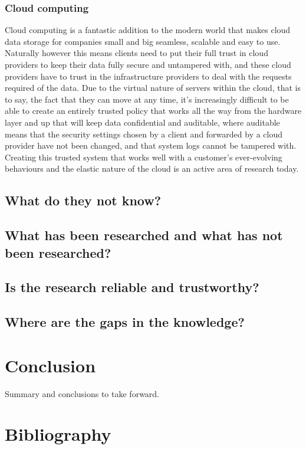 \documentclass[a4paper, 11pt]{article}
\begin{document}
\subsubsection{Cloud computing}
Cloud computing is a fantastic addition to the modern world that makes cloud data storage for companies small and big seamless, scalable and easy to use. \cite{ref:jang2014survey} Naturally however this means clients need to put their full trust in cloud providers to keep their data fully secure and untampered \cite{ref:zhang2010cloud} with, and these cloud providers have to trust in the infrastructure providers to deal with the requests required of the data. Due to the virtual nature of servers within the cloud, that is to say, the fact that they can move at any time, it's increasingly difficult to be able to create an entirely trusted policy that works all the way from the hardware layer and up that will keep data confidential and auditable, where auditable means that the security settings chosen by a client and forwarded by a cloud provider have not been changed, and that system logs cannot be tampered with. \cite{ref:zhang2010cloud} Creating this trusted system that works well with a customer's ever-evolving behaviours and the elastic nature of the cloud is an active area of research today.

\subsection{What do they not know?}


\subsection{What has been researched and what has not been researched?}


\subsection{Is the research reliable and trustworthy?}


\subsection{Where are the gaps in the knowledge?}

\section{Conclusion}
Summary and conclusions to take forward.

\section{Bibliography}


\end{document}
